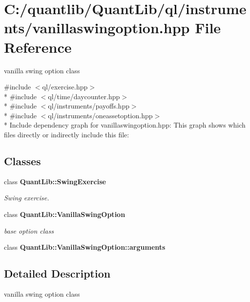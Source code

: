 \section{C\+:/quantlib/\+Quant\+Lib/ql/instruments/vanillaswingoption.hpp File Reference}
\label{vanillaswingoption_8hpp}


vanilla swing option class  


{\ttfamily \#include $<$ql/exercise.\+hpp$>$}\\*
{\ttfamily \#include $<$ql/time/daycounter.\+hpp$>$}\\*
{\ttfamily \#include $<$ql/instruments/payoffs.\+hpp$>$}\\*
{\ttfamily \#include $<$ql/instruments/oneassetoption.\+hpp$>$}\\*
Include dependency graph for vanillaswingoption.\+hpp\+:
This graph shows which files directly or indirectly include this file\+:
\subsection*{Classes}
\begin{DoxyCompactItemize}
\item 
class {\bf Quant\+Lib\+::\+Swing\+Exercise}
\begin{DoxyCompactList}\small\item\em Swing exercise. \end{DoxyCompactList}\item 
class {\bf Quant\+Lib\+::\+Vanilla\+Swing\+Option}
\begin{DoxyCompactList}\small\item\em base option class \end{DoxyCompactList}\item 
class {\bf Quant\+Lib\+::\+Vanilla\+Swing\+Option\+::arguments}
\end{DoxyCompactItemize}


\subsection{Detailed Description}
vanilla swing option class 


